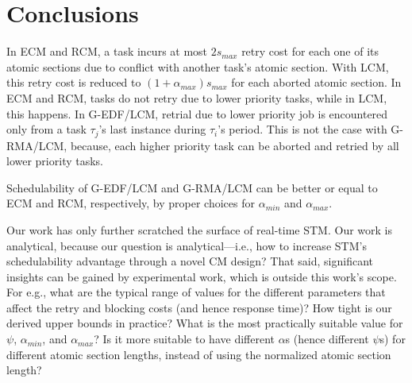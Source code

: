 \documentclass[conference]{IEEEtran}
\begin{document}
\section{Conclusions}
\label{sec:conclusions}

In ECM and RCM, a task incurs at most $2s_{max}$ retry cost for each one of its atomic sections due to conflict
with another task's atomic section. With LCM, this retry cost is reduced to $(1+\alpha_{max})s_{max}$ for each aborted atomic section. In ECM and RCM, tasks do not retry due to lower priority tasks, while in LCM, this happens. In G-EDF/LCM, retrial due to lower priority job is encountered only from a task
$\tau_{j}$'s last instance during $\tau_{i}$'s period. This is not the case with G-RMA/LCM, because,  each higher priority task can be aborted and retried by all lower priority tasks.

Schedulability of G-EDF/LCM and G-RMA/LCM can be better or equal to ECM and RCM, respectively, by proper choices for $\alpha_{min}$ and $\alpha_{max}$. 

Our work has only further scratched the surface of real-time STM. Our work is analytical, because our question is analytical---i.e., how to increase STM's schedulability advantage through a novel CM design? That said, significant insights can be gained by experimental work, which is outside this work's  scope. For e.g., what are the typical range of values for the different parameters that affect the retry and blocking costs (and hence response time)? How tight is our derived upper bounds in practice? 
What is the most practically suitable
value for $\psi$, $\alpha_{min}$, and $\alpha_{max}$? Is it more suitable to have different $\alpha$s (hence different $\psi$s) for different atomic section lengths, instead of using the normalized atomic section length? 


%
%



\end{document}
